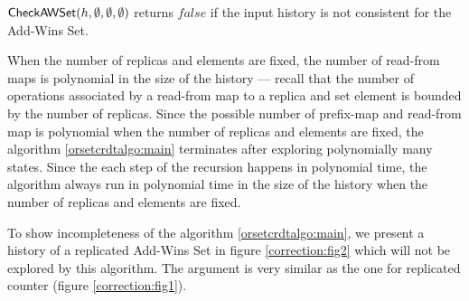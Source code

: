 \begin{theorem}

  $\mathsf{CheckAWSet}({h},\emptyset,\emptyset,\emptyset)$ returns $\mathit{false}$ if the input history is not consistent for the Add-Wins Set.

\end{theorem}

When the number of replicas and elements are fixed, the number of read-from maps is polynomial in the size of the history — recall that the number of operations associated by a read-from map to a replica and set element is bounded by the number of replicas. Since the possible number of prefix-map and read-from map is polynomial when the number of replicas and elements are fixed, the algorithm \ref{orsetcrdtalgo:main} terminates after exploring polynomially many states. Since the each step of the recursion happens in polynomial time, the algorithm always run in polynomial time in the size of the history when the number of replicas and elements are fixed. 


To show incompleteness of the algorithm \ref{orsetcrdtalgo:main}, we present a history of a replicated Add-Wins Set in figure \ref{correction:fig2} which will not be explored by this algorithm. The argument is very similar as the one for replicated counter (figure \ref{correction:fig1}).



